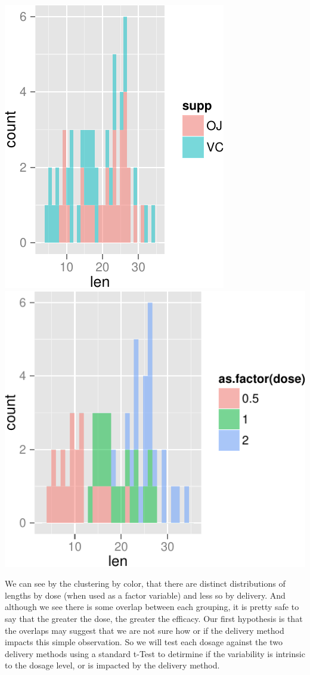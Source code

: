 \documentclass[]{article}
\begin{document}
\includegraphics{06_Project1b_files/figure-latex/plotting1-1.pdf}
\includegraphics{06_Project1b_files/figure-latex/plotting2-1.pdf}

We can see by the clustering by color, that there are distinct
distributions of lengths by dose (when used as a factor variable) and
less so by delivery. And although we see there is some overlap between
each grouping, it is pretty safe to say that the greater the dose, the
greater the efficacy. Our first hypothesis is that the overlaps may
suggest that we are not sure how or if the delivery method impacts this
simple observation. So we will test each dosage against the two delivery
methods using a standard t-Test to detirmine if the variability is
intrinsic to the dosage level, or is impacted by the delivery method.
\end{document}
